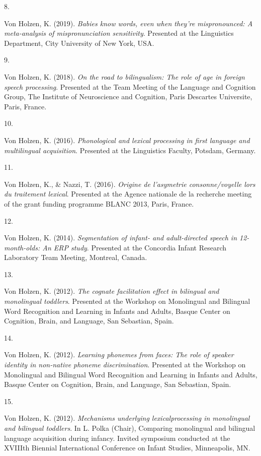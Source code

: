 \documentclass[10pt,a4paper,]{article}
\newlength{\cslhangindent}
\newlength{\csllabelwidth}
\newcommand{\CSLLeftMargin}[1]{\parbox[t]{\csllabelwidth}{\hfill #1~}}
\newcommand{\CSLRightInline}[1]{\parbox[t]{\linewidth - \cslhangindent - \csllabelwidth}{#1}\vspace{0.8ex}}
\begin{document}
\leavevmode{}%
\CSLLeftMargin{8. }%
\CSLRightInline{Von Holzen, K. (2019). \emph{Babies know words, even
when they're mispronounced: A meta-analysis of mispronunciation
sensitivity}. Presented at the Linguistics Department, City University
of New York, USA.}

\leavevmode{}%
\CSLLeftMargin{9. }%
\CSLRightInline{Von Holzen, K. (2018). \emph{On the road to
bilingualism: The role of age in foreign speech processing}. Presented
at the Team Meeting of the Language and Cognition Group, The Institute
of Neuroscience and Cognition, Paris Descartes Universite, Paris,
France.}

\leavevmode{}%
\CSLLeftMargin{10. }%
\CSLRightInline{Von Holzen, K. (2016). \emph{Phonological and lexical
processing in first language and multilingual acquisition}. Presented at
the Linguistics Faculty, Potsdam, Germany.}

\leavevmode{}%
\CSLLeftMargin{11. }%
\CSLRightInline{Von Holzen, K., \& Nazzi, T. (2016). \emph{Origine de
l'asymetrie consonne/voyelle lors du traitement lexical}. Presented at
the Agence nationale de la recherche meeting of the grant funding
programme BLANC 2013, Paris, France.}

\leavevmode{}%
\CSLLeftMargin{12. }%
\CSLRightInline{Von Holzen, K. (2014). \emph{Segmentation of infant- and
adult-directed speech in 12-month-olds: An ERP study}. Presented at the
Concordia Infant Research Laboratory Team Meeting, Montreal, Canada.}

\leavevmode{}%
\CSLLeftMargin{13. }%
\CSLRightInline{Von Holzen, K. (2012). \emph{The cognate facilitation
effect in bilingual and monolingual toddlers}. Presented at the Workshop
on Monolingual and Bilingual Word Recognition and Learning in Infants
and Adults, Basque Center on Cognition, Brain, and Language, San
Sebastian, Spain.}

\leavevmode{}%
\CSLLeftMargin{14. }%
\CSLRightInline{Von Holzen, K. (2012). \emph{Learning phonemes from
faces: The role of speaker identity in non-native phoneme
discrimination}. Presented at the Workshop on Monolingual and Bilingual
Word Recognition and Learning in Infants and Adults, Basque Center on
Cognition, Brain, and Language, San Sebastian, Spain.}

\leavevmode{}%
\CSLLeftMargin{15. }%
\CSLRightInline{Von Holzen, K. (2012). \emph{Mechanisms underlying
lexicalprocessing in monolingual and bilingual toddlers}. In L. Polka
(Chair), Comparing monolingual and bilingual language acquisition during
infancy. Invited symposium conducted at the XVIIIth Biennial
International Conference on Infant Studies, Minneapolis, MN.}
\end{document}
